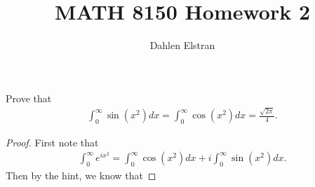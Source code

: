 \documentclass[12pt]{article}
\newenvironment{statement}[2][Statement]{\begin{trivlist}
\item[\hskip \labelsep {\bfseries #1}\hskip \labelsep {\bfseries #2.}]}{\end{trivlist}}
\begin{document}
 
\title{MATH 8150 Homework 2} 
\author{Dahlen Elstran} 
\maketitle

\begin{statement}[Problem]{1}
  Prove that 
  \begin{align*}
    \int^{\infty}_0 \sin(x^2)dx=\int^{\infty}_0 \cos(x^2)dx=\frac{\sqrt{2\pi}}{4}.
  \end{align*}
\end{statement}
\begin{proof}
  First note that 
  \begin{align*}
    \int^{\infty}_0 e^{ix^2} = \int^{\infty}_0 \cos(x^2) dx + i \int^{\infty}_0 \sin(x^2)dx.
  \end{align*}
  Then by the hint, we know that
\end{proof}
\end{document}
